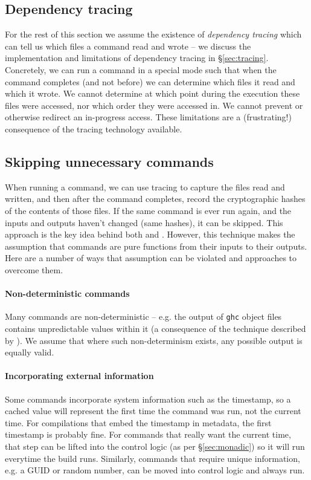 \subsection{Dependency tracing}
\label{sec:assume_tracing}

For the rest of this section we assume the existence of \emph{dependency tracing} which can tell us which files a command read and wrote -- we discuss the implementation and limitations of dependency tracing in \S\ref{sec:tracing}. Concretely, we can run a command in a special mode such that when the command completes (and not before) we can determine which files it read and which it wrote. We cannot determine at which point during the execution these files were accessed, nor which order they were accessed in. We cannot prevent or otherwise redirect an in-progress access. These limitations are a (frustrating!) consequence of the tracing technology available.

\subsection{Skipping unnecessary commands}
\label{sec:skipping_unnecessary}

When running a command, we can use tracing to capture the files read and written, and then after the command completes, record the cryptographic hashes of the contents of those files. If the same command is ever run again, and the inputs and outputs haven't changed (same hashes), it can be skipped. This approach is the key idea behind both \Memoize\cite{memoize} and \Fabricate\cite{fabricate}. However, this technique makes the assumption that commands are pure functions from their inputs to their outputs. Here are a number of ways that assumption can be violated and approaches to overcome them.

\paragraph{Non-deterministic commands} Many commands are non-deterministic -- e.g. the output of \texttt{ghc} object files contains unpredictable values within it (a consequence of the technique described by \citet{lennart:unique_names}). We assume that where such non-determinism exists, any possible output is equally valid.

\paragraph{Incorporating external information} Some commands incorporate system information such as the timestamp, so a cached value will represent the first time the command was run, not the current time. For compilations that embed the timestamp in metadata, the first timestamp is probably fine. For commands that really want the current time, that step can be lifted into the control logic (as per \S\ref{sec:monadic}) so it will run everytime the build runs. Similarly, commands that require unique information, e.g. a GUID or random number, can be moved into control logic and always run.

